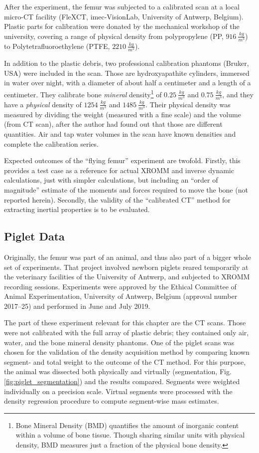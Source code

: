After the experiment, the femur was subjected to a calibrated scan at a local micro-CT facility (FleXCT, imec-VisionLab, University of Antwerp, Belgium).
Plastic parts for calibration were donated by the mechanical workshop of the university, covering a range of physical density from polypropylene (PP, \(916\ \frac{kg}{m^3}\)) to Polytetrafluoroethylene (PTFE, \(2210\ \frac{kg}{m^3}\)).

In addition to the plastic debris, two professional calibration phantoms (Bruker, USA) were included in the scan.
Those are hydroxyapathite cylinders, immersed in water over night, with a diameter of about half a centimeter and a length of a centimeter.
They calibrate bone \emph{mineral} density\footnote{Bone Mineral Density (BMD) quantifies the amount of inorganic content within a volume of bone tissue. Though sharing similar units with physical density, BMD measures just a fraction of the physical bone density.} of \(0.25\ \frac{kg}{m^3}\) and \(0.75\ \frac{kg}{m^3}\), and they have a \emph{physical} density of \(1254\ \frac{kg}{m^3}\) and \(1485\ \frac{kg}{m^3}\).
Their physical density was measured by dividing the weight (measured with a fine scale) and the volume (from CT scan), after the author had found out that those are different quantities.
Air and tap water volumes in the scan have known densities and complete the calibration series.


Expected outcomes of the ``flying femur'' experiment are twofold.
Firstly, this provides a test case as a reference for actual XROMM and inverse dynamic calculations, just with simpler calculations, but including an ``order of magnitude'' estimate of the moments and forces required to move the bone (not reported herein).
Secondly, the validity of the ``calibrated CT'' method for extracting inertial properties is to be evaluated.


\subsection{Piglet Data}
\label{sec:orgf03e1b5}
Originally, the femur was part of an animal, and thus also part of a bigger whole set of experiments.
That project involved newborn piglets reared temporarily at the veterinary facilities of the University of Antwerp, and subjected to XROMM recording sessions.
Experiments were approved by the Ethical Committee of Animal Experimentation, University of Antwerp, Belgium (approval number 2017–25) and performed in June and July 2019.

The part of these experiment relevant for this chapter are the CT scans.
Those were not calibrated with the full array of plastic debris; they contained only air, water, and the bone mineral density phantoms.
One of the piglet scans was chosen for the validation of the density acquisition method by comparing known segment- and total weight to the outcome of the CT method.
For this purpose, the animal was dissected both physically and virtually (segmentation, Fig. \ref{fig:piglet_segmentation}) and the results compared.
Segments were weighted individually on a precision scale.
Virtual segments were processed with the density regression procedure to compute segment-wise mass estimates.

